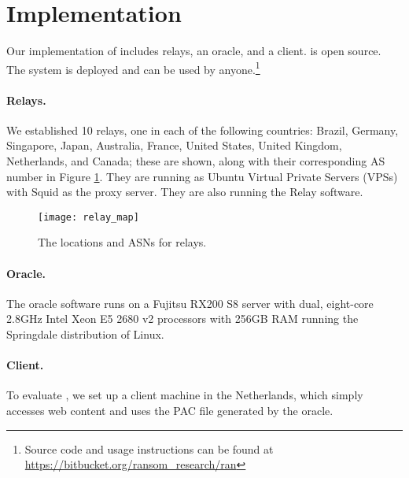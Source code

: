 \section{Implementation}

Our implementation of \system{} includes relays, an oracle, and 
a client. \system{} is open source.  The system is deployed and 
can be used by anyone.\footnote{Source code and usage instructions can be found at \url{https://bitbucket.org/ransom_research/ran}}

\paragraph{Relays.}  We established 10 relays, one in each of the following countries: Brazil, 
Germany, Singapore, Japan, Australia, France, United States, United Kingdom, Netherlands, and Canada; these 
are shown, along with their corresponding AS number in Figure \ref{fig:relay_locations}.  
They are running as Ubuntu Virtual Private Servers (VPSs) with 
Squid as the proxy server.  They are also running the \system{} Relay software.

\begin{figure}[t!]
\centering
\texttt{[image: relay\_map]}
\caption{The locations and ASNs for \system{} relays.}
\label{fig:relay_locations}
\end{figure}

\paragraph{Oracle.}  The oracle software runs on a Fujitsu RX200 S8 server with dual, 
eight-core 2.8GHz Intel Xeon E5 2680 v2 processors with 256GB RAM running the 
Springdale distribution of Linux. 

\paragraph{Client.} To evaluate \system{}, we set up a client 
machine in the Netherlands, which simply accesses web content and uses the PAC 
file generated by the oracle. 
